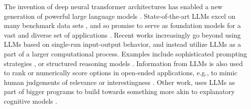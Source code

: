 \documentclass[fleqn]{article}
\begin{document}
The invention of deep neural transformer architectures \citep{VaswaniShazeer2017:Attention-is-Al} has enabled a new generation of powerful large language models  \citep{DevlinChang2019:BERT:-Pre-train,ChungHou2022:Scaling-Instruc,OpenAI2023:GPT-4-Technical,TouvronLavril2023:LLaMA:-Open-and}.
State-of-the-art LLMs excel on many benchmark data sets \citep[e.g.,][]{srivastava2023-BIGbench,PerezRinger2023:Discovering-Lan}, and so promise to serve as foundation models for a vast and diverse set of applications \citep{BommasaniHudson2021:On-the-opportun}.
Recent works increasingly go beyond using LLMs based on single-run input-output behavior, and instead utilize LLMs as a part of a larger computational process.
Examples include sophisticated prompting strategies \citep[e.g.,][]{LiuLiu2022:Generated-Knowl}, or structured reasoning models \citep[e.g.,][]{CreswellShanahan2022:Selection-Infer,GaoMadaan2023:PAL:-Program-ai,ParanjapeLundberg2023:ART:-Automatic-}.
Information from LLMs is also used  to rank or numerically score options in open-ended applications, e.g., to mimic human judgements of relevance or interestingness \citep[e.g.,][]{ParkOBrien2023:Generative-Agen,ZhangLehman2023:OMNI:-Open-ende}.
Other work, uses LLMs as part of bigger programs to build towards something more akin to explanatory cognitive models \citep[e.g.,][]{WongGrand2023:From-Word-Model}.
\end{document}
